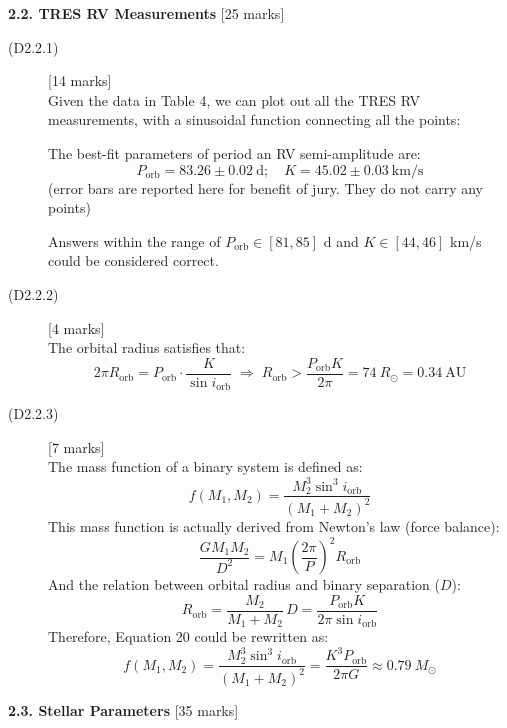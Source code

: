 \medskip
\noindent\textbf{2.2. TRES RV Measurements} \hfill[25 marks]

\begin{description}
\item[(D2.2.1)] \hfill[14 marks]\\
  Given the data in Table 4, we can plot out all the TRES RV measurements,
  with a sinusoidal function connecting all the points:

  The best-fit parameters of period an RV semi-amplitude are:
  \[ P_{\mathrm{orb}} = 83.26 \pm 0.02\ \mathrm{d};\quad
     K = 45.02 \pm 0.03\ \mathrm{km/s} \tag*{(18)} \]
  (error bars are reported here for benefit of jury. They do not carry any
  points)

  Answers within the range of $P_{\mathrm{orb}} \in [81, 85]$ d and
  $K \in [44, 46]$ km/s could be considered correct.

\item[(D2.2.2)] \hfill[4 marks]\\
  The orbital radius satisfies that:
  \[ 2\pi R_{\mathrm{orb}} = P_{\mathrm{orb}} \cdot
     \frac{K}{\sin i_{\mathrm{orb}}}
     \;\Rightarrow\;
     R_{\mathrm{orb}} > \frac{P_{\mathrm{orb}} K}{2\pi}
     = 74\ R_\odot = 0.34\ \mathrm{AU} \tag*{(19)} \]

\item[(D2.2.3)] \hfill[7 marks]\\
  The mass function of a binary system is defined as:
  \[ f(M_1, M_2) = \frac{M_2^3 \sin^3 i_{\mathrm{orb}}}
     {(M_1 + M_2)^2} \tag*{(20)} \]
  This mass function is actually derived from Newton's law (force balance):
  \[ \frac{G M_1 M_2}{D^2}
     = M_1 \left( \frac{2\pi}{P} \right)^2 R_{\mathrm{orb}} \tag*{(21)} \]
  And the relation between orbital radius and binary separation ($D$):
  \[ R_{\mathrm{orb}} = \frac{M_2}{M_1 + M_2}\,D
     = \frac{P_{\mathrm{orb}} K}{2\pi \sin i_{\mathrm{orb}}} \tag*{(22)} \]
  Therefore, Equation 20 could be rewritten as:
  \[ f(M_1, M_2) = \frac{M_2^3 \sin^3 i_{\mathrm{orb}}}{(M_1 + M_2)^2}
     = \frac{K^3 P_{\mathrm{orb}}}{2\pi G}
     \approx 0.79\ M_\odot \tag*{(23)} \]
\end{description}

\medskip
\noindent\textbf{2.3. Stellar Parameters} \hfill[35 marks]

